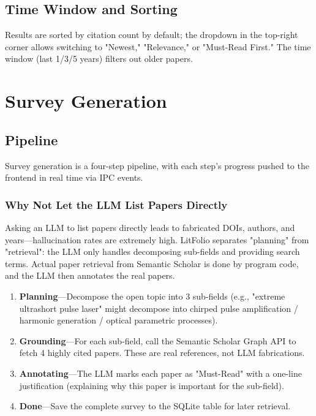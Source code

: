 \subsection{Time Window and Sorting}

Results are sorted by citation count by default; the dropdown in the top-right corner allows
switching to "Newest," "Relevance," or "Must-Read First." The time window (last 1/3/5 years)
filters out older papers.

\section{Survey Generation}


\subsection{Pipeline}

Survey generation is a four-step pipeline, with each step's progress pushed to the frontend in
real time via IPC events.

\subsubsection{Why Not Let the LLM List Papers Directly}

Asking an LLM to list papers directly leads to fabricated DOIs, authors, and
years---hallucination rates are extremely high. LitFolio separates "planning"
from "retrieval": the LLM only handles decomposing sub-fields and providing
search terms. Actual paper retrieval from Semantic Scholar is done by program code, and the
LLM then annotates the real papers.

\begin{enumerate}
  \item \textbf{Planning}---Decompose the open topic into 3 sub-fields (e.g., "extreme ultrashort
    pulse laser" might decompose into chirped pulse amplification / harmonic generation / optical
    parametric processes).
  \item \textbf{Grounding}---For each sub-field, call the Semantic Scholar Graph API to fetch 4
    highly cited papers. These are real references, not LLM fabrications.
  \item \textbf{Annotating}---The LLM marks each paper as "Must-Read" with a one-line
    justification (explaining why this paper is important for the sub-field).
  \item \textbf{Done}---Save the complete survey to the SQLite  table for
    later retrieval.
\end{enumerate}

